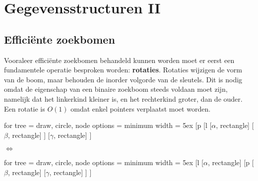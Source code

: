 \documentclass{report}
\begin{document}
	\tableofcontents
	\part{Gegevensstructuren II}
	\chapter{Efficiënte zoekbomen}
	Vooraleer efficiënte zoekbomen behandeld kunnen worden moet er eerst een fundamentele operatie besproken worden: \textbf{rotaties}. Rotaties wijzigen de vorm van de boom, maar behouden de inorder volgorde van de sleutels. Dit is nodig omdat de eigenschap van een binaire zoekboom steeds voldaan moet zijn, namelijk dat het linkerkind kleiner is, en het rechterkind groter, dan de ouder. Een rotatie is $O(1)$ omdat enkel pointers verplaatst moet worden.
	
	\begin{adjustbox}{valign=t}
		\begin{forest}
			for tree = {draw, circle, node options = {minimum width = 5ex}}
			[p
				[l
					[$\alpha$, rectangle]
					[$\beta$, rectangle]
				]
				[$\gamma$, rectangle]
			]	
		\end{forest}
	\end{adjustbox}\qquad
	\begin{adjustbox}{valign=c}
	$\Leftrightarrow$
	\end{adjustbox}\qquad
	\begin{adjustbox}{valign=t}
		\begin{forest}
			for tree = {draw, circle, node options = {minimum width = 5ex}}
			[l
				[$\alpha$, rectangle]
				[p
					[$\beta$, rectangle]
					[$\gamma$, rectangle]	
				]
			]	
		\end{forest}
	\end{adjustbox}
	
	
\end{document}
